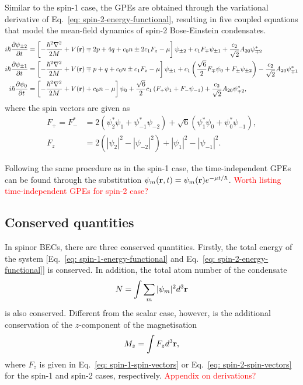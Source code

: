 Similar to the spin-1 case, the GPEs are obtained through the variational
derivative of Eq.~\eqref{eq: spin-2-energy-functional}, resulting in
five coupled equations that model the mean-field dynamics of spin-2
Bose-Einstein condensates.
\begin{align}
    i\hbar\pdv{\psi_{\pm 2}}{t} & = \left[-\frac{\hbar^2\nabla^2}{2M}
        + V(\vb{r}) \mp 2p + 4q + c_0n \pm 2c_1F_z - \mu\right]\psi_{\pm 2}
    + c_1F_{\mp}\psi_{\pm 1} + \frac{c_2}{\sqrt{2}}A_{20}\psi_{\mp 2}^*
    \label{eq: spin-2-GPEs-pm2}                                            \\
    i\hbar\pdv{\psi_{\pm 1}}{t} & = \left[-\frac{\hbar^2\nabla^2}{2M}
        + V(\vb{r}) \mp p + q + c_0n \pm c_1F_z - \mu\right]\psi_{\pm 1}
    + c_1\left(\frac{\sqrt{6}}{2}F_{\mp}\psi_0 + F_{\pm}\psi_{\pm 2}\right)
    - \frac{c_2}{\sqrt{2}}A_{20}\psi_{\mp 1}^* \label{eq: spin-2-GPEs-pm1} \\
    i\hbar\pdv{\psi_0}{t}       & = \left[-\frac{\hbar^2\nabla^2}{2M}
        + V(\vb{r}) + c_0n - \mu\right]\psi_0
    + \frac{\sqrt{6}}{2}c_1\left(F_+\psi_1 + F_-\psi_{-1}\right)
    + \frac{c_2}{\sqrt{2}}A_{20}\psi_{\mp 2}^*, \label{eq: spin-2-GPEs-0}
\end{align}
where the spin vectors are given as
\begin{align}\label{eq: spin-2-spin-vectors}
    F_+ = F_-^* & = 2(\psi_2^*\psi_1 + \psi_{-1}^*\psi_{-2})
    + \sqrt{6}(\psi_1^*\psi_0 + \psi_0^*\psi_{-1}),                             \\
    F_z         & = 2(|\psi_2|^2 - |\psi_{-2}|^2) + |\psi_1|^2 - |\psi_{-1}|^2.
\end{align}

Following the same procedure as in the spin-1 case, the time-independent GPEs
can be found through the substitution
\(\psi_m(\vb{r}, t) = \psi_m(\vb{r})e^{-\mu t/\hbar}\).
\textcolor{red}{Worth listing time-independent GPEs for spin-2 case?}

\subsection{Conserved quantities}
In spinor BECs, there are three conserved quantities.
Firstly, the total energy of the system
    [Eq.~\eqref{eq: spin-1-energy-functional} and
        Eq.~\eqref{eq: spin-2-energy-functional}] is conserved.
In addition, the total atom number of the condensate
\begin{align}
    N = \int \sum_m |\psi_m|^2 d^3\vb{r}
\end{align}
is also conserved.
Different from the scalar case, however, is the additional conservation of the
\(z\)-component of the magnetisation
\begin{align}\label{eq: magnetisation-formula}
    M_z = \int F_z d^3\vb{r},
\end{align}
where \(F_z\) is given in Eq.~\eqref{eq: spin-1-spin-vectors} or
Eq.~\eqref{eq: spin-2-spin-vectors} for the spin-1 and spin-2 cases,
respectively.
\textcolor{red}{Appendix on derivations?}

